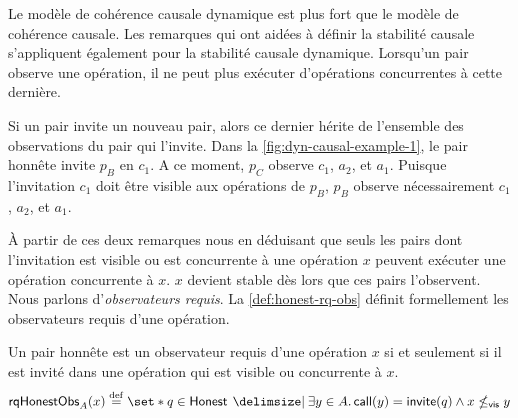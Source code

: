 
Le modèle de cohérence causale dynamique est plus fort que le modèle de cohérence causale.
Les remarques qui ont aidées à définir la stabilité causale s'appliquent également pour la stabilité causale dynamique.
Lorsqu'un pair observe une opération, il ne peut plus exécuter d'opérations concurrentes à cette dernière.

Si un pair invite un nouveau pair, alors ce dernier hérite de l'ensemble des observations du pair qui l'invite.
Dans la \autoref{fig:dyn-causal-example-1}, le pair honnête invite $p_B$ en $c_1$.
A ce moment, $p_C$ observe $c_1$, $a_2$, et $a_1$.
Puisque l'invitation $c_1$ doit être visible aux opérations de $p_B$, $p_B$ observe nécessairement $c_1$, $a_2$, et $a_1$.

À partir de ces deux remarques nous en déduisant que seuls les pairs dont l'invitation est visible ou est concurrente à une opération $x$ peuvent exécuter une opération concurrente à $x$.
$x$ devient stable dès lors que ces pairs l'observent.
Nous parlons d'\emph{observateurs requis}.
La \autoref{def:honest-rq-obs} définit formellement les observateurs requis d'une opération.

\begin{definition}\label{def:honest-rq-obs}
Un pair honnête est un observateur requis d'une opération $x$ si et seulement si il est invité dans une opération qui est visible ou concurrente à $x$.
\begin{equation*}
    \trm{rqHonestObs}_A(x) \defeq \set*{q \in \trm{Honest} \given \exists y \in A \qsep \trm{call}(y) = \trm{invite}(q) \land x \nviseq y}
\end{equation*}
\end{definition}

\clearpage

